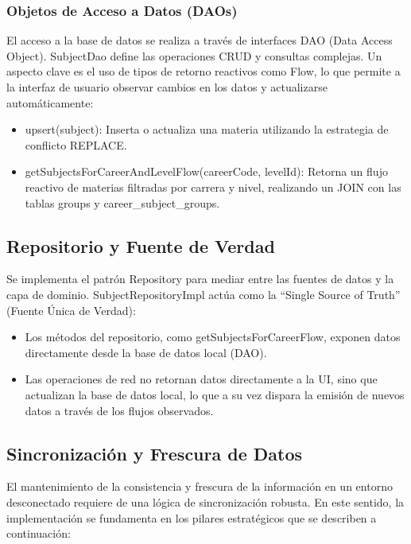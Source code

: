 \subsubsection{Objetos de Acceso a Datos (DAOs)}
El acceso a la base de datos se realiza a través de interfaces DAO (Data Access Object). SubjectDao define las operaciones CRUD y consultas complejas. Un aspecto clave es el uso de tipos de retorno reactivos como Flow, lo que permite a la interfaz de usuario observar cambios en los datos y actualizarse automáticamente:
\begin{itemize}
    \item upsert(subject): Inserta o actualiza una materia utilizando la estrategia de conflicto REPLACE.
    \item getSubjectsForCareerAndLevelFlow(careerCode, levelId): Retorna un flujo reactivo de materias filtradas por carrera y nivel, realizando un JOIN con las tablas groups y career\_subject\_groups.
\end{itemize}

\subsection{Repositorio y Fuente de Verdad}
Se implementa el patrón Repository para mediar entre las fuentes de datos y la capa de dominio. SubjectRepositoryImpl actúa como la ``Single Source of Truth'' (Fuente Única de Verdad):
\begin{itemize}
    \item Los métodos del repositorio, como getSubjectsForCareerFlow, exponen datos directamente desde la base de datos local (DAO).
    \item Las operaciones de red no retornan datos directamente a la UI, sino que actualizan la base de datos local, lo que a su vez dispara la emisión de nuevos datos a través de los flujos observados.
\end{itemize}

\subsection{Sincronización y Frescura de Datos}
El mantenimiento de la consistencia y frescura de la información en un entorno desconectado requiere de una lógica de sincronización robusta. En este sentido, la implementación se fundamenta en los pilares estratégicos que se describen a continuación:

